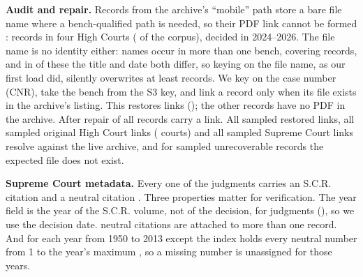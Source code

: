\textbf{Audit and repair.} Records from the archive's ``mobile'' path store a bare file name where a bench-qualified path is needed, so their PDF link cannot be formed \cite{hcdatasetdoc}: \MobileTotal{} records in four High Courts (\MobilePct{} of the corpus), \MobileRecentPct{} decided in 2024--2026. The file name is no identity either: \CollideStems{} names occur in more than one bench, covering \CollideRows{} records, and in \CollideDiffBothPct{} of these the title and date both differ, so keying on the file name, as our first load did, silently overwrites at least \CollideLost{} records. We key on the case number (CNR), take the bench from the S3 key, and link a record only when its file exists in the archive's listing. This restores \MobileLinked{} links (\MobileLinkedPct); the other \MobileUnrecov{} records have no PDF in the archive. After repair \LinkedPct{} of all records carry a link. All \RecoveredChecked{} sampled restored links, all \NonmobileChecked{} sampled original High Court links (\NonmobileCourts{} courts) and all \SCLinksChecked{} sampled Supreme Court links resolve against the live archive, and for \UnresolvedChecked{} sampled unrecoverable records the expected file does not exist.



\textbf{Supreme Court metadata.} Every one of the \CorpusSC{} judgments carries an S.C.R. citation and \SCwithNeutral{} a neutral citation \cite{scneutral}. Three properties matter for verification. The year field is the year of the S.C.R. volume, not of the decision, for \SCYearNe{} judgments (\SCYearNePct), so we use the decision date. \SCDupGroups{} neutral citations are attached to more than one record. And for each year from 1950 to 2013 except \INSCIncompleteList{} the index holds every neutral number from 1 to the year's maximum \cite{scneutral2}, so a missing number is unassigned for those \INSCCompleteCount{} years.

